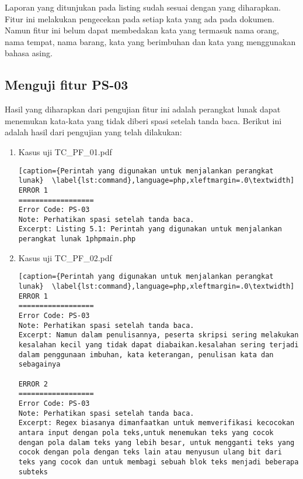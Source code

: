 Laporan yang ditunjukan pada listing sudah sesuai dengan yang diharapkan. Fitur ini melakukan pengecekan pada setiap kata yang ada pada dokumen. Namun fitur ini belum dapat membedakan kata yang termasuk nama orang, nama tempat, nama barang, kata yang berimbuhan dan kata yang menggunakan bahasa asing.

\subsection{Menguji fitur PS-03}
Hasil yang diharapkan dari pengujian fitur ini adalah perangkat lunak dapat menemukan kata-kata yang tidak diberi spasi setelah tanda baca. Berikut ini adalah hasil dari pengujian yang telah dilakukan:

\begin{enumerate}
	\item Kasus uji TC\_PF\_01.pdf
	
\begin{lstlisting}[caption={Perintah yang digunakan untuk menjalankan perangkat lunak}	\label{lst:command},language=php,xleftmargin=.0\textwidth]
ERROR 1
==================
Error Code: PS-03
Note: Perhatikan spasi setelah tanda baca.
Excerpt: Listing 5.1: Perintah yang digunakan untuk menjalankan perangkat lunak 1phpmain.php
\end{lstlisting}
	
	\item Kasus uji TC\_PF\_02.pdf
	
\begin{lstlisting}[caption={Perintah yang digunakan untuk menjalankan perangkat lunak}	\label{lst:command},language=php,xleftmargin=.0\textwidth]
ERROR 1
==================
Error Code: PS-03
Note: Perhatikan spasi setelah tanda baca.
Excerpt: Namun dalam penulisannya, peserta skripsi sering melakukan kesalahan kecil yang tidak dapat diabaikan.kesalahan sering terjadi dalam penggunaan imbuhan, kata keterangan, penulisan kata dan sebagainya

ERROR 2
==================
Error Code: PS-03
Note: Perhatikan spasi setelah tanda baca.
Excerpt: Regex biasanya dimanfaatkan untuk memverifikasi kecocokan antara input dengan pola teks,untuk menemukan teks yang cocok dengan pola dalam teks yang lebih besar, untuk mengganti teks yang cocok dengan pola dengan teks lain atau menyusun ulang bit dari teks yang cocok dan untuk membagi sebuah blok teks menjadi beberapa subteks
\end{lstlisting}
\end{enumerate}

